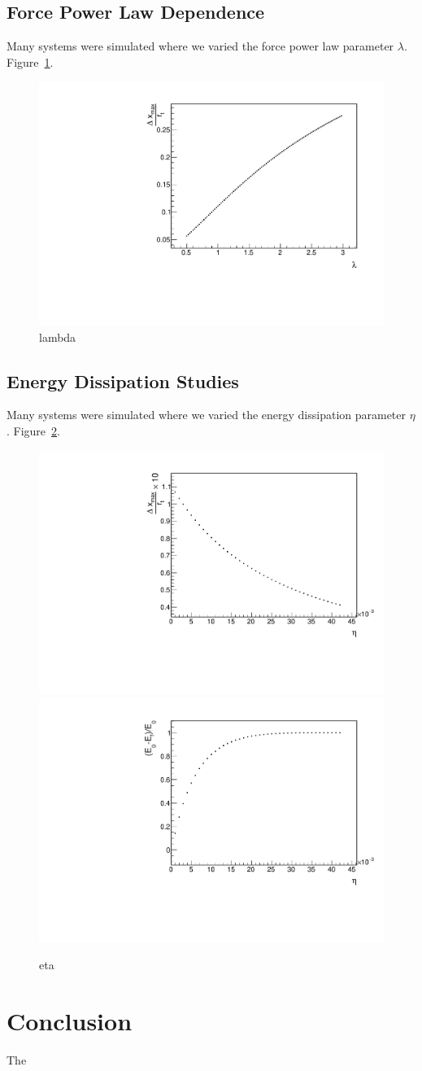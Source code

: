 \documentclass[aps,prl,floatfix,preprint,nofootinbib]{revtex4}
\begin{document}
\subsection{Force Power Law Dependence}
Many systems were simulated where we varied the force power law parameter $\lambda$. Figure~\ref{fig:changing_lambda}.
\begin{figure}[h!]
  \includegraphics[width=.45\linewidth]{plots/trend_plots/dxmax_vs_lambda.pdf}
  \caption{lambda}
  \label{fig:changing_lambda}
\end{figure}

\subsection{Energy Dissipation Studies}
Many systems were simulated where we varied the energy dissipation parameter $\eta$. Figure~\ref{fig:changing_eta}.
\begin{figure}[h!]
  \includegraphics[width=.45\linewidth]{plots/trend_plots/dxmax_vs_eta.pdf}
  \includegraphics[width=.45\linewidth]{plots/trend_plots/Eloss_vs_eta.pdf}
  \caption{eta}
  \label{fig:changing_eta}
\end{figure}


\section{Conclusion}
The
\end{document}
